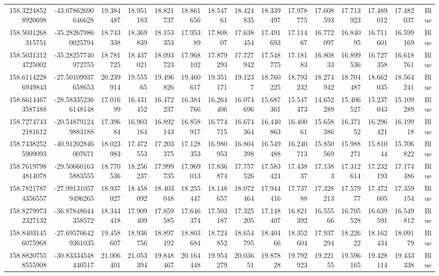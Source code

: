 \begin{center}
\begin{longtable}{rrrrrrrrrrrrrrr}
158.32248528920698 & -43.07862690646628 & 19.384487 & 18.951183 & 18.821737 & 18.861656 & 18.54761 & 18.424835 & 18.339497 & 17.978775 & 17.608593 & 17.713923 & 17.489012 & 17.482037 & Blue \\
158.5031268315751 & -35.282679860025794 & 18.743338 & 18.369839 & 18.153353 & 17.95389 & 17.80807 & 17.638454 & 17.491693 & 17.11467 & 16.772097 & 16.84095 & 16.711601 & 16.599169 & Blue \\
158.50313124725002 & -35.28257740972755 & 18.781725 & 18.437021 & 18.093723 & 17.968102 & 17.879293 & 17.727942 & 17.548775 & 17.18183 & 16.80833 & 16.899536 & 16.727358 & 16.618761 & Blue \\
158.61142286949843 & -27.50109937658653 & 20.239914 & 19.55565 & 19.496826 & 19.460617 & 19.351171 & 19.1237 & 18.760225 & 18.793232 & 18.274942 & 18.704487 & 18.662035 & 18.564241 & Blue \\
158.66144673587488 & -28.583352366148148 & 17.01699 & 16.431452 & 16.472237 & 16.384766 & 16.264406 & 16.074696 & 15.687361 & 15.547473 & 14.652289 & 15.406527 & 15.237043 & 15.109289 & Blue \\
158.72747432181612 & -20.548791249883188 & 17.39684 & 16.903164 & 16.892143 & 16.858917 & 16.774715 & 16.674364 & 16.440863 & 16.40061 & 15.658386 & 16.37152 & 16.296421 & 16.19918 & Blue \\
158.74382525909093 & -40.91202846007671 & 18.023983 & 17.472553 & 17.203375 & 17.128353 & 16.980953 & 16.804398 & 16.549488 & 16.240713 & 15.850569 & 15.988271 & 15.81044 & 15.706822 & Blue \\
158.76197984814078 & -29.506601635883555 & 18.770536 & 18.256237 & 17.999735 & 17.969013 & 17.836874 & 17.757526 & 17.583424 & 17.43837 & 17.1383 & 17.312614 & 17.232193 & 17.174486 & Blue \\
158.78217874356557 & -27.991310579496265 & 18.937027 & 18.458092 & 18.403048 & 18.255447 & 18.148657 & 18.072464 & 17.944416 & 17.73788 & 17.328213 & 17.57977 & 17.472605 & 17.359154 & Blue \\
158.82799732327132 & -36.87848044358572 & 18.344418 & 17.909409 & 17.859585 & 17.646374 & 17.503187 & 17.325205 & 17.148407 & 16.821392 & 16.55566 & 16.705528 & 16.639591 & 16.549812 & Blue \\
158.84031456075968 & -27.695706429361035 & 19.458607 & 18.936756 & 18.897192 & 18.803684 & 18.724852 & 18.654795 & 18.40466 & 18.352604 & 17.937294 & 18.22622 & 18.162434 & 18.09179 & Blue \\
158.88207558555908 & -30.83334548440517 & 21.006401 & 21.053394 & 19.848467 & 20.164448 & 19.954279 & 20.03651 & 19.87828 & 19.792923 & 19.22155 & 19.596165 & 19.428114 & 19.433338 & Blue \\

\end{longtable}
\end{center}
